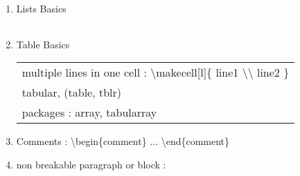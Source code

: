 \begin{enumerate}

     \item Lists Basics

          \begin{myTableStyle} \begin{tabular}{ |m{10cm}| } \hline
                \\ \hline
          \end{tabular} \end{myTableStyle} \vspace{0.08in}

     \item Table Basics

          \begin{myTableStyle} \begin{tabular}{ |m{14cm}| } \hline
                \\ \hline
               multiple lines in one cell : \textbackslash makecell[l]\{ line1 \textbackslash \textbackslash \; line2 \}  \\ \hline
               tabular, (table, tblr) \\ \hline
               packages : array, tabularray            \\ \hline
          \end{tabular} \end{myTableStyle} \vspace{0.08in}

     \item Comments  :  \textbackslash begin\{comment\}      ...   \textbackslash end\{comment\}

     \item non breakable paragraph or block :

          \begin{myTableStyle} \begin{tabular}{ |m{8cm}| } \hline
               \\ \hline
          \end{tabular} \end{myTableStyle} \vspace{0.08in}



\end{enumerate}
